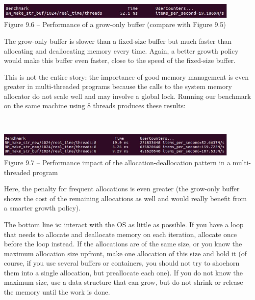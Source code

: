 \hspace*{\fill} \\ %
\begin{center}
\includegraphics[width=0.9\textwidth]{content/3/chapter9/images/6.jpg}\\
Figure 9.6 – Performance of a grow-only buffer (compare with Figure 9.5)
\end{center}

The grow-only buffer is slower than a fixed-size buffer but much faster than allocating and deallocating memory every time. Again, a better growth policy would make this buffer even faster, close to the speed of the fixed-size buffer. 

This is not the entire story: the importance of good memory management is even greater in multi-threaded programs because the calls to the system memory allocator do not scale well and may involve a global lock. Running our benchmark on the same machine using 8 threads produces these results:

\hspace*{\fill} \\ %
\begin{center}
\includegraphics[width=0.9\textwidth]{content/3/chapter9/images/7.jpg}\\
Figure 9.7 – Performance impact of the allocation-deallocation pattern in a multi-threaded program
\end{center}

Here, the penalty for frequent allocations is even greater (the grow-only buffer shows the cost of the remaining allocations as well and would really benefit from a smarter growth policy). 

The bottom line is: interact with the OS as little as possible. If you have a loop that needs to allocate and deallocate memory on each iteration, allocate once before the loop instead. If the allocations are of the same size, or you know the maximum allocation size upfront, make one allocation of this size and hold it (of course, if you use several buffers or containers, you should not try to shoehorn them into a single allocation, but preallocate each one). If you do not know the maximum size, use a data structure that can grow, but do not shrink or release the memory until the work is done. 

